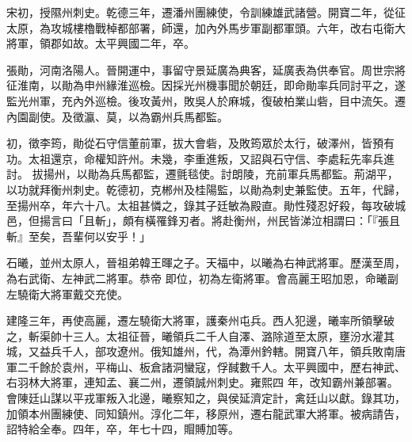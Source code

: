 \begin{pinyinscope}
 宋初，授隰州刺史。乾德三年，遷潘州團練使，令訓練雄武諸營。開寶二年，從征太原，為攻城樓櫓戰棹都部署，師還，加內外馬步軍副都軍頭。六年，改右屯衛大將軍，領郡如故。太平興國二年，卒。



 張勛，河南洛陽人。晉開運中，事留守景延廣為典客，延廣表為供奉官。周世宗將征淮南，以勛為申州緣淮巡檢。因採光州機事聞於朝廷，即命勛率兵同討平之，遂監光州軍，充內外巡檢。後攻黃州，敗吳人於麻城，復破柏業山砦，目中流矢。遷內園副使。及徵瀛、莫，以為霸州兵馬都監。



 初，徵李筠，勛從石守信董前軍，拔大會砦，及敗筠眾於太行，破澤州，皆預有功。太祖還京，命權知許州。未幾，李重進叛，又詔與石守信、李處耘先率兵進討。
 拔揚州，以勛為兵馬都監，遷氈毯使。討朗陵，充前軍兵馬都監。荊湖平，以功就拜衡州刺史。乾德初，克郴州及桂陽監，以勛為刺史兼監使。五年，代歸，至揚州卒，年六十八。太祖甚憐之，錄其子廷敏為殿直。勛性殘忍好殺，每攻破城邑，但揚言曰「且斬」，頗有橫罹鋒刃者。將赴衡州，州民皆涕泣相謂曰：「『張且斬』至矣，吾輩何以安乎！」



 石曦，並州太原人，晉祖弟韓王暉之子。天福中，以曦為右神武將軍。歷漢至周，為右武衛、左神武二將軍。恭帝
 即位，初為左衛將軍。會高麗王昭加恩，命曦副左驍衛大將軍戴交充使。



 建隆三年，再使高麗，遷左驍衛大將軍，護秦州屯兵。西人犯邊，曦率所領擊破之，斬渠帥十三人。太祖征晉，曦領兵二千人自澤、潞除道至太原，壅汾水灌其城，又益兵千人，部攻遼州。俄知雄州，代，為潭州鈐轄。開寶八年，領兵敗南唐軍二千餘於袁州，平梅山、板倉諸洞蠻寇，俘馘數千人。太平興國中，歷右神武、右羽林大將軍，連知孟、襄二州，遷領誠州刺史。雍熙四
 年，改知霸州兼部署。會陳廷山謀以平戎軍叛入北邊，曦察知之，與侯延濟定計，禽廷山以獻。錄其功，加領本州團練使、同知鎮州。淳化二年，移原州，遷右龍武軍大將軍。被病請告，詔特給全奉。四年，卒，年七十四，賵賻加等。




\end{pinyinscope}
